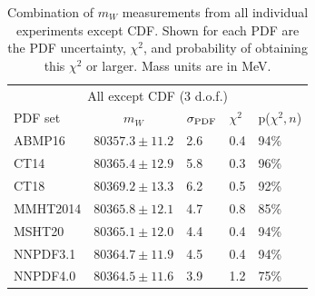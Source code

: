
\begin{table}[!tp]
  \centering
\begin{tabular}{lllll}
\hline \hline 
                                       \multicolumn{5}{c}{All except CDF (3 d.o.f.)} \\
PDF set                      & \multicolumn{1}{c}{$m_W$} & $\sigma_{\scriptsize\textrm{PDF}}$ & $\chi^2$ & p($\chi^2,n$) \\
\hline
                             ABMP16 & $80357.3 \pm 11.2$ &  2.6 &  0.4 & 94\% \\
                               CT14 & $80365.4 \pm 12.9$ &  5.8 &  0.3 & 96\% \\
                               CT18 & $80369.2 \pm 13.3$ &  6.2 &  0.5 & 92\% \\
                           MMHT2014 & $80365.8 \pm 12.1$ &  4.7 &  0.8 & 85\% \\
                             MSHT20 & $80365.1 \pm 12.0$ &  4.4 &  0.4 & 94\% \\
                           NNPDF3.1 & $80364.7 \pm 11.9$ &  4.5 &  0.4 & 94\% \\
                           NNPDF4.0 & $80364.5 \pm 11.6$ &  3.9 &  1.2 & 75\% \\
\hline \hline
\end{tabular}
\caption{Combination of $m_W$ measurements from all individual experiments except CDF.
  Shown for each PDF are the PDF uncertainty, $\chi^2$, and probability of
  obtaining this $\chi^2$ or larger.  Mass units are in MeV.
  \label{tbl:all3_opt2}}
\end{table}



